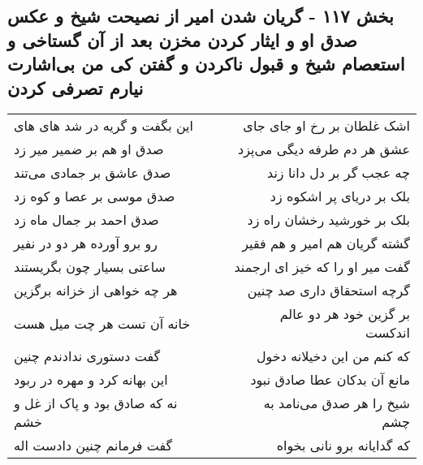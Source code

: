 \begin{center}
\section*{بخش ۱۱۷ - گریان شدن امیر از نصیحت شیخ و عکس صدق او و ایثار کردن مخزن بعد از آن گستاخی و استعصام شیخ و قبول ناکردن و گفتن کی من بی‌اشارت نیارم تصرفی کردن}
\label{sec:sh117}
\begin{longtable}{l p{0.5cm} r}
این بگفت و گریه در شد های های
&&
اشک غلطان بر رخ او جای جای
\\
صدق او هم بر ضمیر میر زد
&&
عشق هر دم طرفه دیگی می‌پزد
\\
صدق عاشق بر جمادی می‌تند
&&
چه عجب گر بر دل دانا زند
\\
صدق موسی بر عصا و کوه زد
&&
بلک بر دریای پر اشکوه زد
\\
صدق احمد بر جمال ماه زد
&&
بلک بر خورشید رخشان راه زد
\\
رو برو آورده هر دو در نفیر
&&
گشته گریان هم امیر و هم فقیر
\\
ساعتی بسیار چون بگریستند
&&
گفت میر او را که خیز ای ارجمند
\\
هر چه خواهی از خزانه برگزین
&&
گرچه استحقاق داری صد چنین
\\
خانه آن تست هر چت میل هست
&&
بر گزین خود هر دو عالم اندکست
\\
گفت دستوری ندادندم چنین
&&
که کنم من این دخیلانه دخول
\\
این بهانه کرد و مهره در ربود
&&
مانع آن بدکان عطا صادق نبود
\\
نه که صادق بود و پاک از غل و خشم
&&
شیخ را هر صدق می‌نامد به چشم
\\
گفت فرمانم چنین دادست اله
&&
که گدایانه برو نانی بخواه
\\
\end{longtable}
\end{center}
